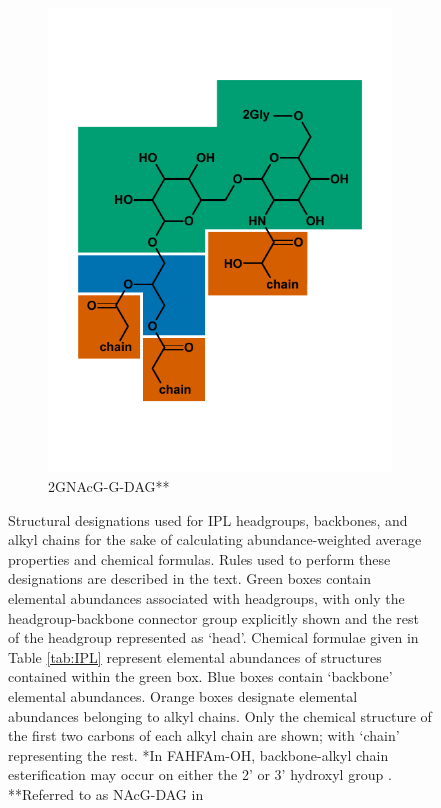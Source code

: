 {\begin{figure}[h]
\begin{subfigure}[b]{.3\linewidth}
        \includegraphics[width=\linewidth]{figs_ch1/2GNAcG-G-DAG}
    	\caption{2GNAcG-G-DAG**}
        \label{fig:2GNAcG-G-DAG}
    \end{subfigure}

    
\caption[Structural designations used for IPL headgroups, backbones, and alkyl chains]{Structural designations used for IPL headgroups, backbones, and alkyl chains for the sake of calculating abundance-weighted average properties and chemical formulas. Rules used to perform these designations are described in the text. Green boxes contain elemental abundances associated with headgroups, with only the headgroup-backbone connector group explicitly shown and the rest of the headgroup represented as `head'. Chemical formulae given in Table \ref{tab:IPL} represent elemental abundances of structures contained within the green box. Blue boxes contain `backbone' elemental abundances. Orange boxes designate elemental abundances belonging to alkyl chains. Only the chemical structure of the first two carbons of each alkyl chain are shown; with `chain' representing the rest. *In FAHFAm-OH, backbone-alkyl chain esterification may occur on either the 2' or 3' hydroxyl group \citep{diercks2015accumulation}. **Referred to as NAcG-DAG in \cite{schubotz2013spatial}}
\label{fig:IPLdivision}
\end{figure}
\doublespace
\clearpage
}


